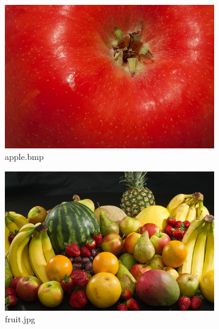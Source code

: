 \documentclass{l4proj}
\begin{document}
\begin{appendices}
\begin{figure}[!h]
    \centering
    \begin{subfigure}[b]{0.3\textwidth}
        \includegraphics[width=\textwidth]{images/apple.png}
        \caption{apple.bmp}
        \label{apple.bmp}
    \end{subfigure}
    \begin{subfigure}[b]{0.3\textwidth}
        \includegraphics[width=\textwidth]{images/fruit.jpg}
        \caption{fruit.jpg}
        \label{fruit.jpg}
    \end{subfigure}
    \begin{subfigure}[b]{0.3\textwidth}

\end{subfigure}
\end{figure}
\end{appendices}
\end{document}

